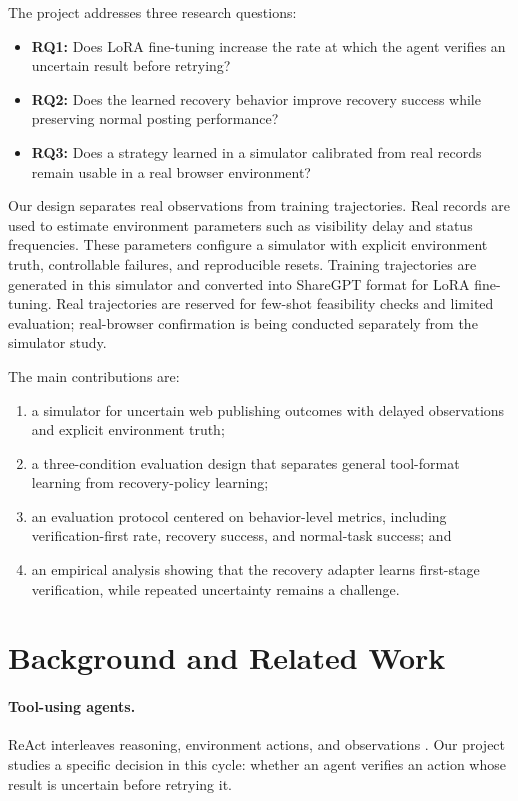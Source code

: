 \documentclass[11pt]{article}
\begin{document}
The project addresses three research questions:
\begin{itemize}
  \item \textbf{RQ1:} Does LoRA fine-tuning increase the rate at which the agent verifies an uncertain result before retrying?
  \item \textbf{RQ2:} Does the learned recovery behavior improve recovery success while preserving normal posting performance?
  \item \textbf{RQ3:} Does a strategy learned in a simulator calibrated from real records remain usable in a real browser environment?
\end{itemize}

Our design separates real observations from training trajectories. Real records are used to estimate environment parameters such as visibility delay and status frequencies. These parameters configure a simulator with explicit environment truth, controllable failures, and reproducible resets. Training trajectories are generated in this simulator and converted into ShareGPT format for LoRA fine-tuning. Real trajectories are reserved for few-shot feasibility checks and limited evaluation; real-browser confirmation is being conducted separately from the simulator study.

The main contributions are:
\begin{enumerate}
  \item a simulator for uncertain web publishing outcomes with delayed observations and explicit environment truth;
  \item a three-condition evaluation design that separates general tool-format learning from recovery-policy learning;
  \item an evaluation protocol centered on behavior-level metrics, including verification-first rate, recovery success, and normal-task success; and
  \item an empirical analysis showing that the recovery adapter learns first-stage verification, while repeated uncertainty remains a challenge.
\end{enumerate}

\section{Background and Related Work}

\paragraph{Tool-using agents.}
ReAct interleaves reasoning, environment actions, and observations \citep{yao2023react}. Our project studies a specific decision in this cycle: whether an agent verifies an action whose result is uncertain before retrying it.
\end{document}
